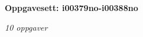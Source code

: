 \centerline{\bf Oppgavesett: i00379no-i00388no}
\vskip 10pt
\centerline{\it 10 oppgaver}\vskip 10pt
\vskip 10pt
